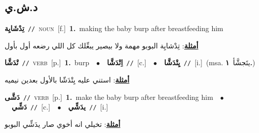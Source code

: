\documentclass[10pt,a4paper,twoside]{article} %
\begin{document}
\begin{multicols}{2}
\vspace{-3mm}
\subsection*{\color{blue}\foreignlanguage{arabic}{د.ش.ي}\color{blue}{}} 

{\setlength\topsep{0pt}\textbf{\foreignlanguage{arabic}{تِدْشَايِة}}\ {\color{gray}\texttt{//}\color{black}}\ \textsc{noun}\ [f.]\ \textbf{1.}~making the baby burp after breastfeeding him\  \begin{flushright}\color{gray}\foreignlanguage{arabic}{\textbf{\underline{\foreignlanguage{arabic}{أمثلة}}}: تِدْشايِة البوبو مهمة ولا بيصير يبعِّلك كل اللي رضعه أول بأول}\end{flushright}\color{black}} \vspace{2mm}

{\setlength\topsep{0pt}\textbf{\foreignlanguage{arabic}{تْدَشَّا}}\ {\color{gray}\texttt{//}\color{black}}\ \textsc{verb}\ [p.]\ \textbf{1.}~burp\ \ $\bullet$\ \ \setlength\topsep{0pt}\textbf{\foreignlanguage{arabic}{اِتْدَشَّا}}\ {\color{gray}\texttt{//}\color{black}}\ [c.]\ \ $\bullet$\ \ \setlength\topsep{0pt}\textbf{\foreignlanguage{arabic}{يِتْدَشَّا}}\ {\color{gray}\texttt{//}\color{black}}\ [i.]\ \color{gray}(msa. \foreignlanguage{arabic}{يتَجشَّأ}~\foreignlanguage{arabic}{\textbf{١.}})\color{black}\  \begin{flushright}\color{gray}\foreignlanguage{arabic}{\textbf{\underline{\foreignlanguage{arabic}{أمثلة}}}: استني عليه يِتْدَشّا بالأول بعدين نيميه}\end{flushright}\color{black}} \vspace{2mm}

{\setlength\topsep{0pt}\textbf{\foreignlanguage{arabic}{دَشَّى}}\ {\color{gray}\texttt{//}\color{black}}\ \textsc{verb}\ [p.]\ \textbf{1.}~make the baby burp after breastfeeding him\ \ $\bullet$\ \ \setlength\topsep{0pt}\textbf{\foreignlanguage{arabic}{دَشِّي}}\ {\color{gray}\texttt{//}\color{black}}\ [c.]\ \ $\bullet$\ \ \setlength\topsep{0pt}\textbf{\foreignlanguage{arabic}{يدَشِّي}}\ {\color{gray}\texttt{//}\color{black}}\ [i.]\  \begin{flushright}\color{gray}\foreignlanguage{arabic}{\textbf{\underline{\foreignlanguage{arabic}{أمثلة}}}: تخيلي انه أخوي صار يدَشِّي البوبو}\end{flushright}\color{black}} \vspace{2mm}


\end{multicols}
\end{document}
